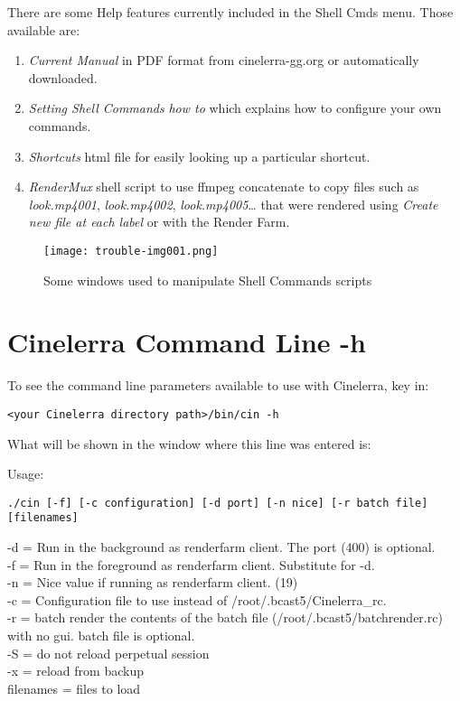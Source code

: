 There are some Help features currently included in the Shell Cmds menu. Those available are:

\begin{enumerate}
	\item \textit{Current Manual} in PDF format from cinelerra-gg.org or automatically downloaded.
	\item \textit{Setting Shell Commands} \textit{how to} which explains how to configure your own commands.
	\item \textit{Shortcuts} html file for easily looking up a particular shortcut.
	\item \textit{RenderMux} shell script to use ffmpeg concatenate to copy files such as \textit{look.mp4001}, \textit{look.mp4002}, \textit{look.mp4005}{\dots} that were rendered using \textit{Create new file at each label} or with the Render Farm.
\end{enumerate}
\clearpage

\begin{figure}[h!]
	\centering
	\texttt{[image: trouble-img001.png]} 
	\caption{Some windows used to manipulate Shell Commands scripts}
	\label{fig:shell_script_manupulation}
\end{figure}

\section{Cinelerra Command Line -h}%
\label{cha:cinelerra_command_line_-h}

To see the command line parameters available to use with Cinelerra, key in:

\qquad \texttt{<your Cinelerra directory path>/bin/cin -h}

What will be shown in the window where this line was entered is:

Usage:

\texttt{./cin [-f] [-c configuration] [-d port] [-n nice] [-r batch file] [filenames]}

-d = Run in the background as renderfarm client.  The port (400) is optional.\\
-f = Run in the foreground as renderfarm client. Substitute for -d.\\
-n = Nice value if running as renderfarm client. (19)\\
-c = Configuration file to use instead of /root/.bcast5/Cinelerra\_rc.\\
-r = batch render the contents of the batch file (/root/.bcast5/batchrender.rc) with no gui. batch file is optional.\\
-S = do not reload perpetual session\\
-x = reload from backup\\
filenames = files to load

